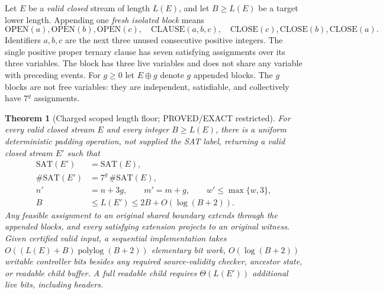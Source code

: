 \documentclass[11pt]{article}
\newtheorem{theorem}{Theorem}
\begin{document}
Let $E$ be a \emph{valid closed} stream of length $L(E)$, and
let $B\ge L(E)$ be a target lower length. Appending one
\emph{fresh isolated block} means
\[
 \mathrm{OPEN}(a),\mathrm{OPEN}(b),\mathrm{OPEN}(c),\quad
 \mathrm{CLAUSE}(a,b,c),\quad
 \mathrm{CLOSE}(c),\mathrm{CLOSE}(b),\mathrm{CLOSE}(a).
 \tag{2}
\]
Identifiers $a,b,c$ are the next three unused consecutive
positive integers. The single positive proper ternary clause has
seven satisfying assignments over its three variables.
The block has three live variables and does not share any
variable with preceding events. For $g\ge0$ let $E\oplus g$
denote $g$ appended blocks. The $g$ blocks are not free
variables: they are independent, satisfiable, and collectively
have $7^g$ assignments.
\begin{theorem}[Charged scoped length floor; PROVED/EXACT restricted]
For every valid closed stream $E$ and every integer $B\ge L(E)$,
there is a uniform deterministic padding operation, not supplied
the SAT label, returning a valid closed stream $E'$ such that
\[
 \begin{split}
 \mathrm{SAT}(E')&=\mathrm{SAT}(E),\\
 \#\mathrm{SAT}(E')&=7^g\,\#\mathrm{SAT}(E),\\
 n'&=n+3g,\qquad m'=m+g,\qquad
 w'\le\max\{w,3\},\\
 B&\le L(E')\le 2B+O(\log(B+2)).
 \end{split}\tag{3}
\]
Any feasible assignment to an original shared boundary extends
through the appended blocks, and every satisfying extension
projects to an original witness. Given certified valid input,
a sequential implementation takes
$O((L(E)+B)\operatorname{polylog}(B+2))$ elementary bit work,
$O(\log(B+2))$ writable controller bits \emph{besides}
any required source-validity checker, ancestor state, or
readable child buffer. A full readable child requires
$\Theta(L(E'))$ additional live bits, including headers.
\end{theorem}
\end{document}
